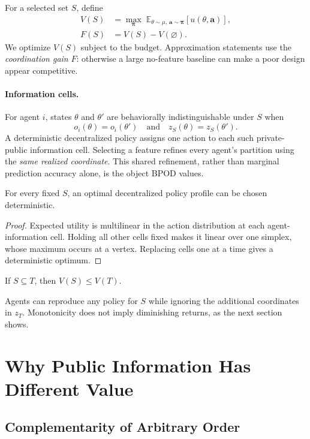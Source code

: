 For a selected set $S$, define
\begin{align}
V(S)&=\max_{\boldsymbol\pi}\;\mathbb E_{\theta\sim\mu,\,\mathbf a\sim\boldsymbol\pi}
        [u(\theta,\mathbf a)],\\
F(S)&=V(S)-V(\varnothing).
\end{align}
We optimize $V(S)$ subject to the budget. Approximation statements use the \emph{coordination gain} $F$: otherwise a large no-feature baseline can make a poor design appear competitive.

\paragraph{Information cells.}
For agent $i$, states $\theta$ and $\theta'$ are behaviorally indistinguishable under $S$ when
\[
o_i(\theta)=o_i(\theta')
\quad\text{and}\quad
z_S(\theta)=z_S(\theta').
\]
A deterministic decentralized policy assigns one action to each such private-public information cell. Selecting a feature refines every agent's partition using the \emph{same realized coordinate}. This shared refinement, rather than marginal prediction accuracy alone, is the object BPOD values.

\begin{lemma}
For every fixed $S$, an optimal decentralized policy profile can be chosen deterministic.
\end{lemma}
\begin{proof}
Expected utility is multilinear in the action distribution at each agent-information cell. Holding all other cells fixed makes it linear over one simplex, whose maximum occurs at a vertex. Replacing cells one at a time gives a deterministic optimum.
\end{proof}

\begin{lemma}[Monotonicity]
If $S\subseteq T$, then $V(S)\le V(T)$.
\end{lemma}
Agents can reproduce any policy for $S$ while ignoring the additional coordinates in $z_T$. Monotonicity does not imply diminishing returns, as the next section shows.

\section{Why Public Information Has Different Value}

\subsection{Complementarity of Arbitrary Order}

